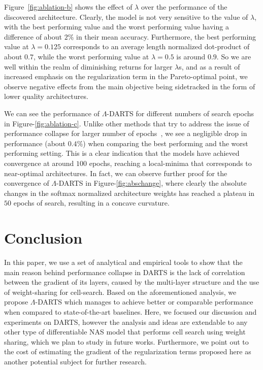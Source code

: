 \documentclass{article} \usepackage{fancyhdr, iclr2023_conference, times}
\newcommand{\mydarts}{$\Lambda$-DARTS\xspace}
\begin{document}
\par Figure~\ref{fig:ablation-b} shows the effect of $\lambda$ over the performance of the discovered architecture. Clearly, the model is not very sensitive to the value of $\lambda$, with the best performing value and the worst performing value having a difference of about $2\%$ in their mean accuracy. Furthermore, the best performing value at $\lambda=0.125$ corresponds to an average length normalized dot-product of about $0.7$, while the worst performing value at $\lambda=0.5$ is around $0.9$. So we are well within the realm of diminishing returns for larger $\lambda$s, and as a result of increased emphasis on the regularization term in the Pareto-optimal point, we observe negative effects from the main objective being sidetracked in the form of lower quality architectures.
\par We can see the performance of \mydarts for different numbers of search epochs in Figure-\ref{fig:ablation-c}. Unlike other methods that try to address the issue of performance collapse for larger number of epochs~\citep{DBLP:journals/corr/abs-1910-11831, DBLP:conf/iclr/ChuW0LWY21}, we see a negligible drop in performance (about $0.4\%$) when comparing the best performing and the worst performing setting. This is a clear indication that the models have achieved convergence at around $100$ epochs, reaching a local-minima that corresponds to near-optimal architectures. In fact, we can observe further proof for the convergence of \mydarts in Figure-\ref{fig:abschange}, where clearly the absolute changes in the softmax normalized architecture weights has reached a plateau in $50$ epochs of search, resulting in a concave curvature. 
\section{Conclusion}
\par In this paper, we use a set of analytical and empirical tools to show that the main reason behind performance collapse in DARTS is the lack of correlation between the gradient of its layers, caused by the multi-layer structure and the use of weight-sharing for cell-search. Based on the aforementioned analysis, we propose \mydarts which manages to achieve better or comparable performance when compared to state-of-the-art baselines.
Here, we focused our discussion and experiments on DARTS, however the analysis and ideas are extendable to any other type of differentiable NAS model that performs cell search using weight sharing, which we plan to study in future works. Furthermore, we point out to the cost of estimating the gradient of the regularization terms proposed here as another potential subject for further research.
\end{document}
